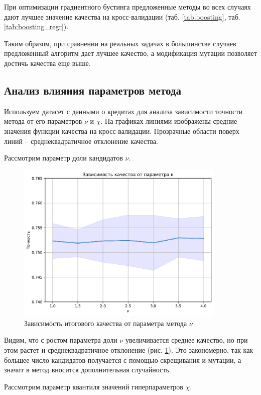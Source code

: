 \documentclass[a4paper,12pt]{article}
\begin{document}
При оптимизации градиентного бустинга предложенные методы во всех случаях дают лучшее значение качества на кросс-валидации (таб. \ref{tab:boosting}, таб. \ref{tab:boosting_regr}).

Таким образом, при сравнении на реальных задачах в большинстве случаев предложенный алгоритм дает лучшее качество, а модификация мутации позволяет достичь качества еще выше.


\subsection{Анализ влияния параметров метода}
 
Используем датасет с данными о кредитах для анализа зависимости точности метода от его параметров $\nu$ и $\chi$.
На графиках линиями изображены средние значения функции качества на кросс-валидации. Прозрачные области поверх линий – среднеквадратичное отклонение качества.

\newpage

Рассмотрим параметр доли кандидатов $\nu$.

\begin{figure}[h]
    \centering
    \includegraphics[width=10cm]{nu_ablation.pdf}
    \caption{Зависимость итогового качества от параметра метода $\nu$}
    \label{fig:nu}
\end{figure}
\par

Видим, что с ростом параметра доли $\nu$ увеличивается среднее качество, но при этом растет и среднеквадратичное отклонение (рис. \ref{fig:nu}). Это закономерно, так как большее число кандидатов получается с помощью скрещивания и мутации, а значит в метод вносится дополнительная случайность.

Рассмотрим параметр квантиля значений гиперпараметров $\chi$.
\end{document}
